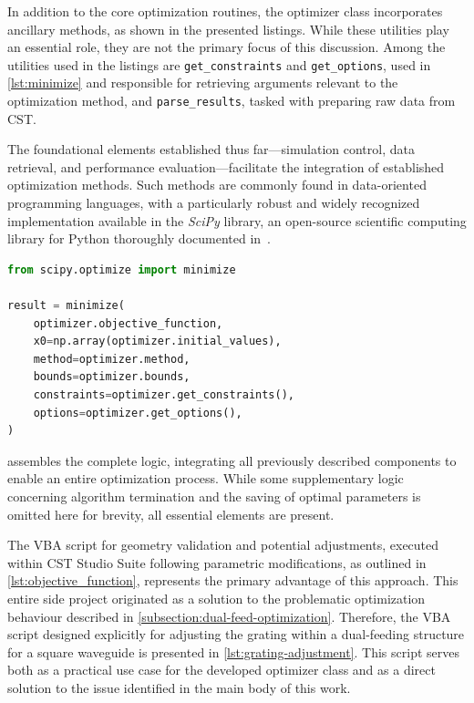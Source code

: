 \documentclass[11pt,a4paper,twoside,openany]{report}
\begin{document}
In addition to the core optimization routines, the optimizer class incorporates ancillary methods, as shown in the presented listings. While these utilities play an essential role, they are not the primary focus of this discussion. Among the utilities used in the listings are \texttt{get\_constraints} and \texttt{get\_options}, used in \cref{lst:minimize} and responsible for retrieving arguments relevant to the optimization method, and \texttt{parse\_results}, tasked with preparing raw data from CST.

The foundational elements established thus far---simulation control, data retrieval, and performance evaluation---facilitate the integration of established optimization methods. Such methods are commonly found in data-oriented programming languages, with a particularly robust and widely recognized implementation available in the \emph{SciPy} library, an open-source scientific computing library for Python thoroughly documented in~\parencite{virtanen-et-al:scipy}.

\begin{lstlisting}[caption={Use of CSTOptimizer with SciPy}, label={lst:minimize}, language=Python]
from scipy.optimize import minimize

result = minimize(
    optimizer.objective_function,
    x0=np.array(optimizer.initial_values),
    method=optimizer.method,
    bounds=optimizer.bounds,
    constraints=optimizer.get_constraints(),
    options=optimizer.get_options(),
)
\end{lstlisting}

 assembles the complete logic, integrating all previously described components to enable an entire optimization process. While some supplementary logic concerning algorithm termination and the saving of optimal parameters is omitted here for brevity, all essential elements are present.

The VBA script for geometry validation and potential adjustments, executed within CST Studio Suite following parametric modifications, as outlined in \cref{lst:objective_function}, represents the primary advantage of this approach. This entire side project originated as a solution to the problematic optimization behaviour described in \cref{subsection:dual-feed-optimization}. Therefore, the VBA script designed explicitly for adjusting the grating within a dual-feeding structure for a square waveguide is presented in \cref{lst:grating-adjustment}. This script serves both as a practical use case for the developed optimizer class and as a direct solution to the issue identified in the main body of this work.
\end{document}
